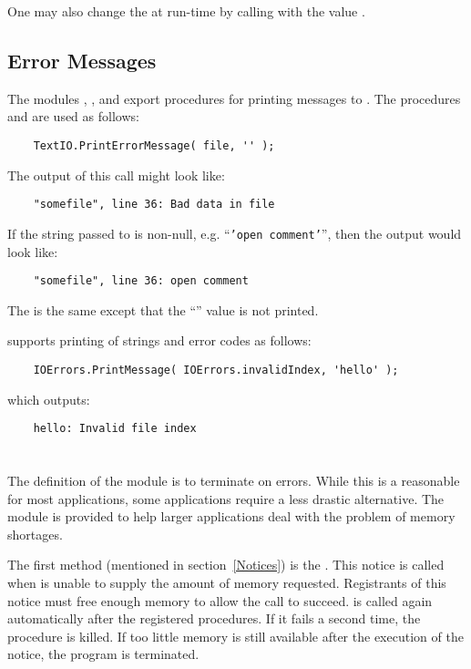 One may also change the  at run-time by
calling  with the value
.

\subsection{Error Messages}

The modules , , and 
export procedures for printing messages to .
The procedures  and 
 are used as follows:
\begin{verbatim}
    TextIO.PrintErrorMessage( file, '' );
\end{verbatim}
The output of this call might look like: 
\begin{verbatim}
    "somefile", line 36: Bad data in file
\end{verbatim}
If the string passed to  is non-null,
e.g. ``{\tt 'open comment'}'', then the output would look like:
\begin{verbatim}
    "somefile", line 36: open comment
\end{verbatim}
The  is the same
except that the ``'' value is not printed.

 supports printing of strings and
error codes as follows:
\begin{verbatim}
    IOErrors.PrintMessage( IOErrors.invalidIndex, 'hello' );
\end{verbatim}
which outputs:
\begin{verbatim}
    hello: Invalid file index
\end{verbatim}

\section{}
\label{OutOfMemory}

The definition of the module  is to terminate
on errors.  While this is a reasonable for most applications,
some applications require a less drastic alternative.   The
module  is provided to help larger
applications deal with the problem of memory shortages.  

The first method (mentioned in section~\ref{Notices}) is the
.  This notice
is called when  is unable to
supply the amount of memory requested.  Registrants of this
notice must free enough memory to allow the 
call to succeed.   is called again automatically
after the registered procedures.  If it fails a second time, the 
procedure is killed.  If too little memory is still available
after the execution of the notice, the program is terminated.

